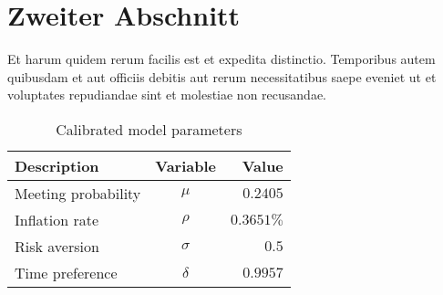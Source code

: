 \section{Zweiter Abschnitt}
\label{sec:ZweiterAbschnitt}

Et harum quidem rerum facilis est et expedita distinctio. Temporibus autem quibusdam et aut officiis debitis aut rerum necessitatibus saepe eveniet ut et voluptates repudiandae sint et molestiae non recusandae. 

\begin{table}[htbp!]
    \centering
	\begin{tabular}{l c r}
        \hline \hline
        Description & Variable & Value \\ \hline
        Meeting probability & $\mu$ & $0.2405$ \\ 
        Inflation rate & $\rho$ & $0.3651\%$ \\ 
        Risk aversion & $\sigma$ & $0.5$ \\
        Time preference & $\delta$ & $0.9957$ \\
        \hline \hline
    \end{tabular}
    \caption{Calibrated model parameters}
    \label{tab:Parameters}
\end{table}